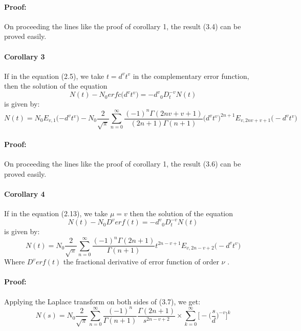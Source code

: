 \documentclass{article}
\begin{document}
\paragraph{Proof:}
On proceeding the lines like the proof of corollary 1, the result (3.4) can be proved easily.

\paragraph{Corollary 3}
If in the equation (2.5), we take $t = {d^v}{t^v}$ in the complementary error function, then the solution of the equation
\begin{equation}
    N(t) -{N_0}erfc\big({d^v}{t^v}\big)= {-d^v}{_0D_t^{-v}}N(t)
\end{equation}
is given by: 
\begin{equation}
    N(t) =
    {N_0}E_{v,1}{\big({-d^v}{t^v}\big)} 
    -N_0
    \frac{2}{\sqrt{\pi}}
    \sum_{n = 0}^{\infty}
    \frac{{(-1)^n}\Gamma{(2nv+v+1)}}{(2n+1)\Gamma{(n+1)}}
    \big({d^v}{t^v}\big)^{2n+1}
    E_{v,2nv+v+1}
    \big(-{d^v}{t^v}\big)
\end{equation}
\paragraph{Proof:}
On proceeding the lines like the proof of corollary 1, the result (3.6) can be proved easily.

\paragraph{Corollary 4}
If in the equation (2.13), we take $\mu = v$ then the solution of the equation
\begin{equation}
    N(t) -{N_0}{D^v}erf(t)= {-d^v}{_0D_t^{-v}}N(t)
\end{equation}
is given by: 
\begin{equation}
    N(t) =
    N_0{\frac{2}{\sqrt{\pi}}}
    \sum_{n = 0}^{\infty}
    \frac{(-1)^n\Gamma{(2n+1)}}{\Gamma{(n+1)}}
    t^{2n-{v}+1}
    E_{v, 2n-{v}+2}
    \big(-{d^v}{t^v})
\end{equation}
Where ${D^v}erf(t)$ the fractional derivative of error function of order $\nu$ .\\ 
\paragraph{Proof:}
Applying the Laplace transform on both sides of (3.7), we get:\\ 
\begin{equation*}
    N(s) = N_0
    {\frac{2}{\sqrt{\pi}}}
    \sum_{n = 0}^{\infty}
    \frac{(-1)^n}{\Gamma{(n+1)}}
    \frac{\Gamma{(2n+1)}}{s^{2n- v +2}}
    \times
    \sum_{k=0}^{\infty}
    \bigg[
        -{\bigg(\frac{s}{d}\bigg)^{-v}}
    \bigg]^k
\end{equation*}
\end{document}
